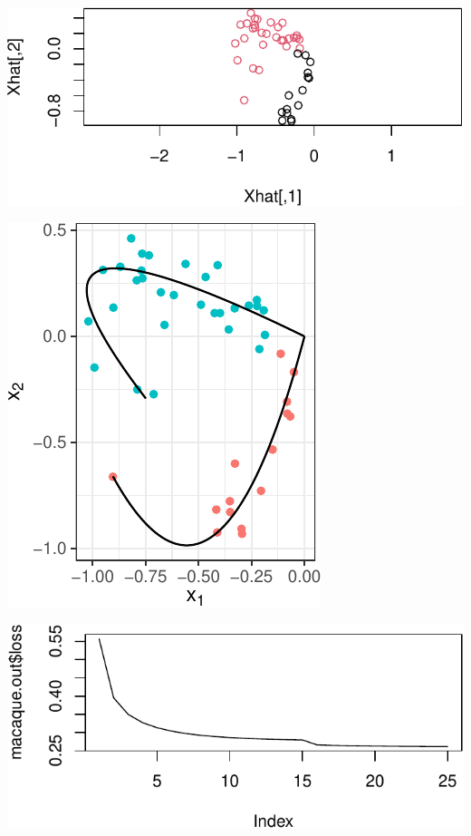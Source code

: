 \documentclass[12pt]{article}
\begin{document}
\begin{example}

\cite{https://doi.org/10.1111/j.1460-9568.2006.04678.x}


\begin{center}\includegraphics{draft_files/figure-latex/unnamed-chunk-8-1} \end{center}




\begin{center}\includegraphics{draft_files/figure-latex/unnamed-chunk-10-1} \end{center}


\begin{center}\includegraphics{draft_files/figure-latex/unnamed-chunk-11-1} \end{center}

\end{example}
\end{document}
